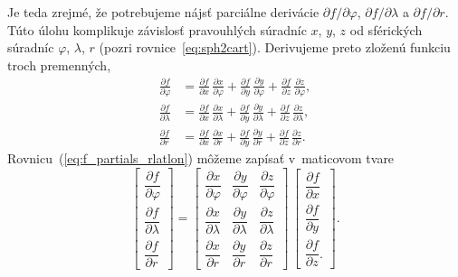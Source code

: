 \documentclass[a4paper,12pt]{book}
\begin{document}
Je teda zrejmé, že potrebujeme nájsť parciálne derivácie $\partial f \slash 
\partial \varphi$, $\partial f \slash \partial \lambda$ a $\partial f \slash 
\partial r$.  Túto úlohu komplikuje závislosť pravouhlých súradníc $x$, $y$, 
$z$ od sférických súradníc $\varphi$, $\lambda$, $r$ (pozri 
rovnice~\ref{eq:sph2cart}).  Derivujeme preto zloženú funkciu troch premenných,
%
\begin{equation}
\label{eq:f_partials_rlatlon}
\begin{split}
\frac{\partial f}{\partial \varphi} &= \frac{\partial f}{\partial x} \, 
\frac{\partial x}{\partial \varphi} + \frac{\partial f}{\partial y} \, 
\frac{\partial y}{\partial \varphi} + \frac{\partial f}{\partial z} \, 
\frac{\partial z}{\partial \varphi}{,}\\[2ex]
%
\frac{\partial f}{\partial \lambda} &= \frac{\partial f}{\partial x} \, 
\frac{\partial x}{\partial \lambda} + \frac{\partial f}{\partial y} \, 
\frac{\partial y}{\partial \lambda} + \frac{\partial f}{\partial z} \, 
\frac{\partial z}{\partial \lambda}{,}\\[2ex]
%
\frac{\partial f}{\partial r} &= \frac{\partial f}{\partial x} \, 
\frac{\partial x}{\partial r} + \frac{\partial f}{\partial y} \, \frac{\partial 
y}{\partial r} + \frac{\partial f}{\partial z} \, \frac{\partial z}{\partial 
r}{.}
\end{split}
\end{equation}
%
Rovnicu~(\ref{eq:f_partials_rlatlon}) môžeme zapísať v~maticovom tvare
%
\begin{equation}
\label{eq:f_partials_rlatlon_2}
\begin{bmatrix}
\dfrac{\partial f}{\partial \varphi}\\[2ex]
\dfrac{\partial f}{\partial \lambda}\\[2ex]
\dfrac{\partial f}{\partial r}
\end{bmatrix}
%
=
%
\begin{bmatrix}
\dfrac{\partial x}{\partial \varphi} & \dfrac{\partial y}{\partial \varphi} 
& \dfrac{\partial z}{\partial \varphi}\\[2ex]
\dfrac{\partial x}{\partial \lambda} & \dfrac{\partial y}{\partial \lambda
} & \dfrac{\partial z}{\partial \lambda}\\[2ex]
\dfrac{\partial x}{\partial r} & \dfrac{\partial y}{\partial r} 
& \dfrac{\partial z}{\partial r}
\end{bmatrix}
%
\,
%
\begin{bmatrix}
\dfrac{\partial f}{\partial x}\\[2ex]
\dfrac{\partial f}{\partial y}\\[2ex]
\dfrac{\partial f}{\partial z}{.}
\end{bmatrix}
%
{.}
\end{equation}
\end{document}
